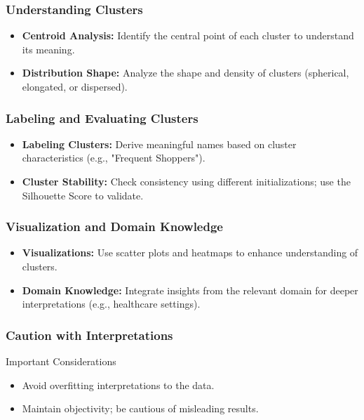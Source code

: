 \documentclass[aspectratio=169]{beamer}
\begin{document}
\begin{frame}[fragile]
    \frametitle{Understanding Clusters}
    \begin{itemize}
        \item \textbf{Centroid Analysis:} Identify the central point of each cluster to understand its meaning.
        \item \textbf{Distribution Shape:} Analyze the shape and density of clusters (spherical, elongated, or dispersed).
    \end{itemize}
\end{frame}

\begin{frame}[fragile]
    \frametitle{Labeling and Evaluating Clusters}
    \begin{itemize}
        \item \textbf{Labeling Clusters:} Derive meaningful names based on cluster characteristics (e.g., "Frequent Shoppers").
        \item \textbf{Cluster Stability:} Check consistency using different initializations; use the Silhouette Score to validate. 
    \end{itemize}
\end{frame}

\begin{frame}[fragile]
    \frametitle{Visualization and Domain Knowledge}
    \begin{itemize}
        \item \textbf{Visualizations:} Use scatter plots and heatmaps to enhance understanding of clusters.
        \item \textbf{Domain Knowledge:} Integrate insights from the relevant domain for deeper interpretations (e.g., healthcare settings).
    \end{itemize}
\end{frame}

\begin{frame}[fragile]
    \frametitle{Caution with Interpretations}
    \begin{block}{Important Considerations}
        \begin{itemize}
            \item Avoid overfitting interpretations to the data.
            \item Maintain objectivity; be cautious of misleading results.
        \end{itemize}
    \end{block}
\end{frame}
\end{document}
